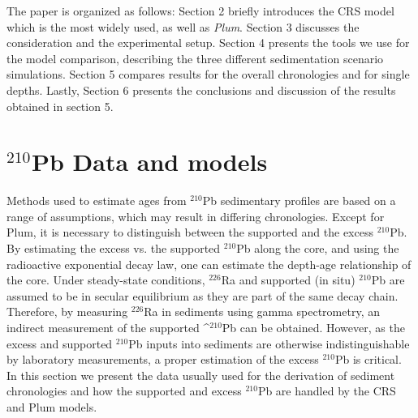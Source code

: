 \documentclass [10pt] {article}
\newcommand{\ca}{\color{black}} %
\begin{document}
	The paper is organized as follows: 
Section 2 briefly introduces the CRS model which is the most widely used, as well as \textit{Plum}.
Section 3 discusses the consideration and the experimental setup.
Section 4 presents the tools we use for the model comparison, describing the three different sedimentation scenario simulations.
Section 5 compares results for the overall chronologies and for single depths.
Lastly, Section 6 presents the conclusions and discussion of the results obtained in section 5. 

\section{$^{210}$Pb Data and models}

Methods used to estimate ages from $^{210}$Pb sedimentary profiles are based on a range of assumptions, which may result in differing chronologies. Except for Plum, it is necessary to distinguish between the supported and the excess $^{210}$Pb. By estimating the excess vs. the supported $^{210}$Pb along the core, and using the radioactive exponential decay law, one can estimate the depth-age relationship of the core. Under steady-state conditions, $^{226}$Ra and supported (in situ) $^{210}$Pb are assumed to be in secular equilibrium as they are part of the same decay chain. Therefore, by measuring $^{226}$Ra in sediments using gamma spectrometry, an indirect measurement of the supported ^$^{210}$Pb can be obtained. However, as the excess and supported $^{210}$Pb inputs into sediments are otherwise indistinguishable by laboratory measurements, a proper estimation of the excess $^{210}$Pb is critical. In this section we present the data usually used for the derivation of sediment chronologies and how the supported and excess $^{210}$Pb are handled by the CRS and Plum models.  %

\end{document}
